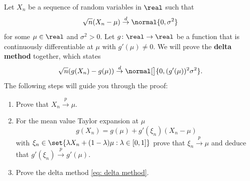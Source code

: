 \begin{exercise}
    \label{ex: delta method}
    Let \(X_n\) be a sequence of random variables in \(\real\) such that
    \[
        \sqrt{n}(X_n - \mu) \overset{d}\to \normal{0, \sigma^2}
    \]
    for some \(\mu\in \real\) and \(\sigma^2 > 0\). Let \(g\colon\real\to\real\)
    be a function that is continuously differentiable at \(\mu\) with \(g'(\mu)\neq 0\).
    We will prove the \textbf{delta method} together, which states
    \begin{equation}
        \label{eq: delta method}    
        \sqrt{n}(g(X_n) - g(\mu)) \overset{d}\to \normal[\big]{0, (g'(\mu))^2\sigma^2}.
    \end{equation}
    The following steps will guide you through the proof:
    \begin{enumerate}[label=(\alph*), noitemsep]
        \item\label{it: (delta-method) X_n to mu} Prove that \(X_n \overset{p}\to \mu\).
        \item\label{it: (delta-method) taylor expansion} For the mean value Taylor expansion at \(\mu\)
        \[
            g(X_n) = g(\mu) + g'(\xi_n)(X_n - \mu)
        \]
        with \(\xi_n \in \set{\lambda X_n + (1-\lambda)\mu : \lambda \in [0,1]}\)
        prove that \(\xi_n \overset{p}\to \mu\) and deduce that \(g'(\xi_n) \overset{p}\to g'(\mu)\).
        \item\label{it: (delta-method) proof} Prove the delta method \eqref{eq: delta method}.
    \end{enumerate}
\end{exercise}
